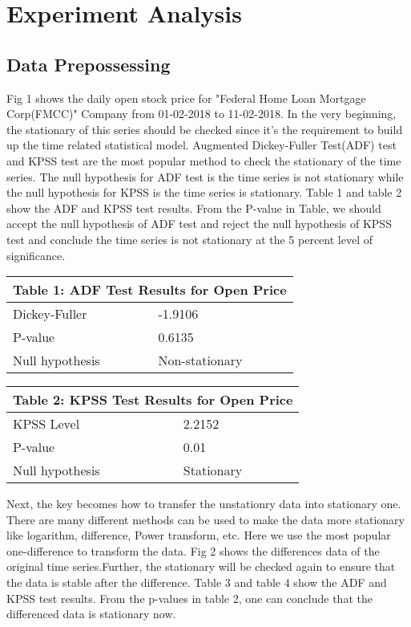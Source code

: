 \section{Experiment Analysis}
\subsection{Data Prepossessing}
Fig 1 shows the daily open stock price for "Federal Home Loan Mortgage Corp(FMCC)" Company from 01-02-2018 to 11-02-2018. In the very beginning, the stationary of this series should be checked since it's the requirement to build up the time related statistical model. Augmented Dickey-Fuller Test(ADF) test and KPSS test are the most popular method to check the stationary of the time series. The null hypothesis for ADF test is the time series is not stationary while the null hypothesis for KPSS is the time series is stationary. Table 1 and table 2 show the ADF and KPSS test results. From the P-value in Table, we should accept the null hypothesis of ADF test and reject the null hypothesis of KPSS test and conclude the time series is not stationary at the 5 percent level of significance.
\begin{table}[]
\centering
\begin{tabular}{|l|l|l|l|l|}
\hline
\multicolumn{5}{|l|}{Table 1: ADF Test Results for Open Price}                 \\ \hline
\multicolumn{3}{|l|}{Dickey-Fuller}          & \multicolumn{2}{l|}{-1.9106}    \\ \hline
\multicolumn{3}{|l|}{P-value}                & \multicolumn{2}{l|}{0.6135}     \\ \hline
\multicolumn{3}{|l|}{Null hypothesis} & \multicolumn{2}{l|}{Non-stationary} \\ \hline
\end{tabular}
\end{table}

\begin{table}[]
\centering
\begin{tabular}{|l|l|l|l|l|}
\hline
\multicolumn{5}{|l|}{Table 2: KPSS Test Results for Open Price}         \\ \hline
\multicolumn{3}{|l|}{KPSS Level}      & \multicolumn{2}{l|}{2.2152}     \\ \hline
\multicolumn{3}{|l|}{P-value}         & \multicolumn{2}{l|}{0.01}       \\ \hline
\multicolumn{3}{|l|}{Null hypothesis} & \multicolumn{2}{l|}{Stationary} \\ \hline
\end{tabular}
\end{table}
Next, the key becomes how to transfer the unstationry data into stationary one. There are many different methods can be used to make the data more stationary like logarithm, difference, Power transform, etc. Here we use the most popular one-difference to transform the data. Fig 2 shows the differences data of the original time series.Further, the stationary will be checked again to ensure that the data is stable after the difference. Table 3 and table 4 show the ADF and KPSS test results. From the p-values in table 2, one can conclude that the differenced data is stationary now. 

